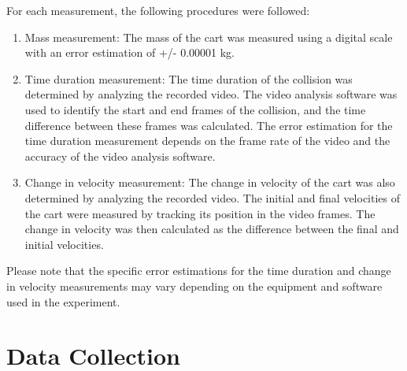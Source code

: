 \documentclass[12pt]{article}
\begin{document}
For each measurement, the following procedures were followed:
\begin{enumerate}
    \item Mass measurement: The mass of the cart was measured using a digital scale with an error estimation of +/- 0.00001 kg.
    
    \item Time duration measurement: The time duration of the collision was determined by analyzing the recorded video. The video analysis software was used to identify the start and end frames of the collision, and the time difference between these frames was calculated. The error estimation for the time duration measurement depends on the frame rate of the video and the accuracy of the video analysis software.
    
    \item Change in velocity measurement: The change in velocity of the cart was also determined by analyzing the recorded video. The initial and final velocities of the cart were measured by tracking its position in the video frames. The change in velocity was then calculated as the difference between the final and initial velocities.
\end{enumerate}

Please note that the specific error estimations for the time duration and change in velocity measurements may vary depending on the equipment and software used in the experiment.

\section{Data Collection}
\begin{table}[H]
    \centering
    \caption{Summary of Experimental Data}
    \label{tab:data}
\end{table}
\end{document}

